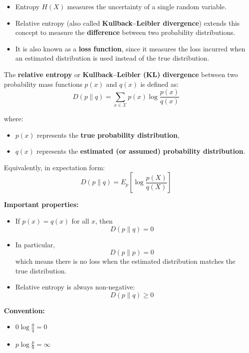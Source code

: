 \documentclass[11pt,a4paper]{book}
\newenvironment{definitionbox}[1][Definition]{
    \begin{tcolorbox}[
        enhanced,
        breakable,
        colback=primaryblue!10,
        colframe=primaryblue!150,
        title=#1,
        fonttitle=\bfseries,
        sharp corners,
        boxrule=0.8pt,
        left=8pt,
        right=8pt,
        top=6pt,
        bottom=6pt
    ]
}{
    \end{tcolorbox}
}
\newenvironment{formulabox}[1][Formula]{
    \begin{tcolorbox}[
        enhanced,
        breakable,
        colback=softcoral!10,
        colframe=softcoral!200,
        title=#1,
        fonttitle=\bfseries,
        coltitle=white,
        sharp corners,
        boxrule=1pt,
        left=8pt,
        right=8pt,
        top=6pt,
        bottom=6pt
    ]
}{
    \end{tcolorbox}
}
\begin{document}
\begin{definitionbox}[Relative Entropy (Kullback--Leibler Divergence)]
\begin{itemize}
    \item Entropy \(H(X)\) measures the uncertainty of a single random variable.
    \item Relative entropy (also called \textbf{Kullback--Leibler divergence}) extends this concept
          to measure the \textbf{difference} between two probability distributions.
    \item It is also known as a \textbf{loss function}, since it measures the loss incurred
          when an estimated distribution is used instead of the true distribution.
\end{itemize}

\begin{formulabox}[Relative Entropy / KL Divergence]
The \textbf{relative entropy} or \textbf{Kullback--Leibler (KL) divergence}
between two probability mass functions \(p(x)\) and \(q(x)\) is defined as:
\[
    D(p \| q) = \sum_{x \in \mathcal{X}} p(x)\log\frac{p(x)}{q(x)}
\]

where:
\begin{itemize}
    \item \(p(x)\) represents the \textbf{true probability distribution},
    \item \(q(x)\) represents the \textbf{estimated (or assumed) probability distribution}.
\end{itemize}

Equivalently, in expectation form:
\[
    D(p \| q) = E_p\!\left[\log\frac{p(X)}{q(X)}\right]
\]
\end{formulabox}

\textbf{Important properties:}
\begin{itemize}
    \item If \(p(x) = q(x)\) for all \(x\), then
          \[
              D(p \| q) = 0
          \]
    \item In particular,
          \[
              D(p \| p) = 0
          \]
          which means there is no loss when the estimated distribution matches the true distribution.
    \item Relative entropy is always non-negative:
          \[
              D(p \| q) \ge 0
          \]
\end{itemize}

\textbf{Convention:}
\begin{itemize}
    \item \(0 \log \frac{0}{q} = 0\)
    \item \(p \log \frac{p}{0} = \infty\)
\end{itemize}
\end{definitionbox}
\end{document}
